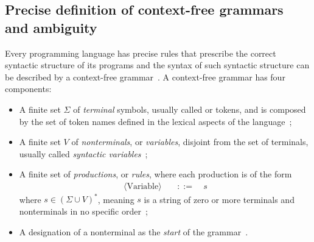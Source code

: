 \documentclass[
    oneside,
    english,
    coorientadorbanca,
    embeddedlogo,
    noabntexcite
]{ufsc-thesis-rn46-2019}
\newcommand{\bnfvars}[1]{\langle\textrm{#1}\rangle}
\newcommand{\bnfprod}[2]{\bnfvars{#1} &\ &::= & #2}
\begin{document}
\subsection{Precise definition of context-free grammars and ambiguity}
Every programming language has precise rules that prescribe the correct syntactic structure of its programs and the syntax of such syntactic structure can be described by a context-free grammar~\cite{Aho:2006:CPT:1177220}.
A context-free grammar has four components:
\begin{itemize}
    \item A finite set $\Sigma$ of \textit{terminal} symbols, usually called or tokens, and is composed by the set of token names defined in the lexical aspects of the language~\cite{Aho:2006:CPT:1177220};
    \item A finite set $V$ of \textit{nonterminals}, or \textit{variables}, disjoint from the set of terminals, usually called \textit{syntactic variables}~\cite{Aho:2006:CPT:1177220};
    \item A finite set of \textit{productions}, or \textit{rules}, where each production is of the form
          \begin{equation*}
              \begin{alignedat}{2}
                  \bnfprod{Variable}{\ s}
              \end{alignedat}
          \end{equation*}
          where $s \in {(\Sigma \cup V)}^*$, meaning $s$ is a string of zero or more terminals and nonterminals in no specific order~\cite{Aho:2006:CPT:1177220, sipser2012introduction};
    \item A designation of a nonterminal as the \textit{start} of the grammar~\cite{Aho:2006:CPT:1177220}.
\end{itemize}
\end{document}
